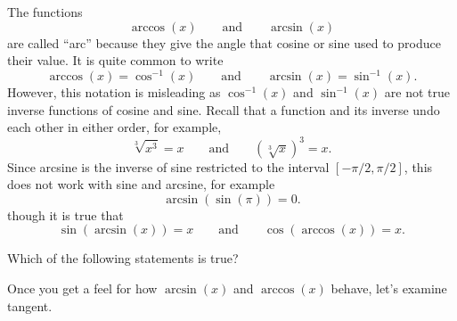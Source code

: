 \documentclass{ximera}
\begin{document}
The functions
\[
\arccos(x)\qquad\text{and}\qquad\arcsin(x)
\]
are called ``arc'' because they give the angle that cosine or sine
used to produce their value.  It is quite common to write
\[
\arccos(x) = \cos^{-1}(x)\qquad\text{and}\qquad\arcsin(x) = \sin^{-1}(x).
\]
However, this notation is misleading as $\cos^{-1}(x)$ and
$\sin^{-1}(x)$ are not true inverse functions of cosine and sine.
Recall that a function and its inverse undo each other in either
order, for example,
\[
\sqrt[3]{x^3}=x\qquad \text{and}\qquad \left(\sqrt[3]{x}\right)^3=x. 
\]
Since arcsine is the inverse of sine restricted to the interval
$[-\pi/2,\pi/2]$, this does not work with sine and arcsine, for
example
\[
\arcsin(\sin(\pi))=0.
\]
though it is true that
\[
\sin(\arcsin(x)) = x\qquad\text{and}\qquad\cos(\arccos(x)) = x.
\]
\begin{question}
   Which of the following statements is true?
   \begin{multipleChoice}
   \end{multipleChoice}  
\end{question}
Once you get a feel for how $\arcsin(x)$ and $\arccos(x)$ behave, let's examine tangent.
\end{document}
